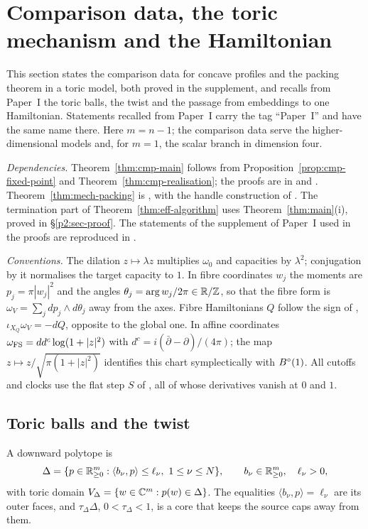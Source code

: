 \section{Comparison data, the toric mechanism and the Hamiltonian}\label{p2:sec-machine}

This section states the comparison data for concave profiles and the packing theorem in a toric model, both proved
in the supplement, and recalls from Paper~I \cite{PaperI} the toric balls, the twist and the passage from embeddings
to one Hamiltonian. Statements recalled from Paper~I carry the tag ``Paper~I'' and have the same name there. Here
$m=n-1$; the comparison data serve the higher-dimensional models and, for $m=1$, the scalar branch in dimension four.

\emph{Dependencies.} Theorem~\ref{thm:cmp-main} follows from Proposition~\ref{prop:cmp-fixed-point} and
Theorem~\ref{thm:cmp-realisation}; the proofs are in  and . Theorem~\ref{thm:mech-packing}
is , with the handle construction of . The termination part of
Theorem~\ref{thm:eff-algorithm} uses Theorem~\ref{thm:main}(i), proved in \S\ref{p2:sec-proof}. The statements of
the supplement of Paper~I used in the proofs are reproduced in .

\emph{Conventions.} The dilation $z\mapsto\lambda z$ multiplies $\omega_0$ and capacities by $\lambda^2$; conjugation by
it normalises the target capacity to $1$. In fibre coordinates $w_j$ the moments are $p_j=\pi|w_j|^2$ and the angles
$\theta_j=\arg w_j/2\pi\in\mathbb{R}/\mathbb{Z}$, so that the fibre form is $\omega_V=\sum_jdp_j\wedge d\theta_j$ away from the axes.
Fibre Hamiltonians $Q$ follow the sign of \cite{OpenAI2026}, $\iota_{X_Q}\omega_V=-dQ$, opposite to the global one. In
affine coordinates $\omega_{\rm FS}=dd^c\log(1+|z|^2)$ with $d^c=i(\bar\partial-\partial)/(4\pi)$; the map
$z\mapsto z/\sqrt{\pi(1+|z|^2)}$ identifies this chart symplectically with $B^{\circ}(1)$. All cutoffs and clocks use the flat
step $S$ of , all of whose derivatives vanish at $0$ and $1$.

\subsection{Toric balls and the twist}\label{I:sec:mech-toric}

A downward polytope is
\[
 \Delta=\{p\in\mathbb{R}^m_{\ge0}:\langle b_\nu,p\rangle\le\ell_\nu,\ 1\le\nu\le N\},
 \qquad b_\nu\in\mathbb{R}^m_{\ge0},\quad \ell_\nu>0,
\]
with toric domain $V_\Delta=\{w\in\mathbb{C}^m:p(w)\in\Delta\}$. The equalities $\langle b_\nu,p\rangle=\ell_\nu$ are its outer
faces, and $\tau_\Delta\Delta$, $0<\tau_\Delta<1$, is a core that keeps the source caps away from them.

